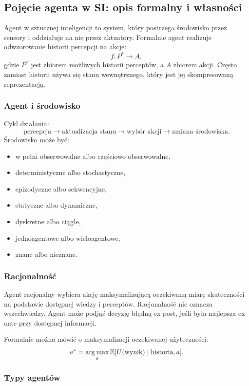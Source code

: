 \subsection{Pojęcie agenta w SI: opis formalny i własności}

Agent w sztucznej inteligencji to system, który postrzega środowisko przez sensory i oddziałuje na nie przez aktuatory. Formalnie agent realizuje odwzorowanie historii percepcji na akcje:
\[
f:P^*\to A,
\]
gdzie $P^*$ jest zbiorem możliwych historii perceptów, a $A$ zbiorem akcji. Często zamiast historii używa się stanu wewnętrznego, który jest jej skompresowaną reprezentacją.

\subsubsection{Agent i środowisko}

Cykl działania:
\[
\text{percepcja}\to\text{aktualizacja stanu}\to\text{wybór akcji}\to\text{zmiana środowiska}.
\]
Środowisko może być:
\begin{itemize}
  \item w pełni obserwowalne albo częściowo obserwowalne,
  \item deterministyczne albo stochastyczne,
  \item epizodyczne albo sekwencyjne,
  \item statyczne albo dynamiczne,
  \item dyskretne albo ciągłe,
  \item jednoagentowe albo wieloagentowe,
  \item znane albo nieznane.
\end{itemize}

\subsubsection{Racjonalność}

Agent racjonalny wybiera akcję maksymalizującą oczekiwaną miarę skuteczności na podstawie dostępnej wiedzy i perceptów. Racjonalność nie oznacza wszechwiedzy. Agent może podjąć decyzję błędną ex post, jeśli była najlepsza ex ante przy dostępnej informacji.

Formalnie można mówić o maksymalizacji oczekiwanej użyteczności:
\[
a^*=\operatorname*{arg\,max}_a \mathbb{E}[U(\text{wynik})\mid \text{historia},a].
\]

\subsubsection{Typy agentów}

